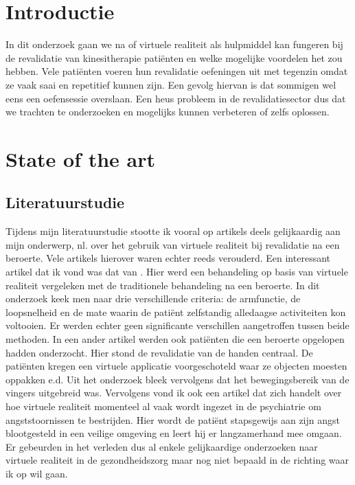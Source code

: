 
\section{Introductie} %
\label{sec:introductie}

In dit onderzoek gaan we na of virtuele realiteit als hulpmiddel kan fungeren bij de revalidatie van kinesitherapie patiënten en welke mogelijke voordelen het zou hebben. Vele patiënten voeren hun revalidatie oefeningen uit met tegenzin omdat ze vaak saai en repetitief kunnen zijn. Een gevolg hiervan is dat sommigen wel eens een oefensessie overslaan. Een heus probleem in de revalidatiesector dus dat we trachten te onderzoeken en mogelijks kunnen verbeteren of zelfs oplossen.



\section{State of the art}
\label{sec:start-of-the-art}

\subsection{Literatuurstudie}
Tijdens mijn literatuurstudie stootte ik vooral op artikels deels gelijkaardig aan mijn onderwerp, nl. over het gebruik van virtuele realiteit bij revalidatie na een beroerte. Vele artikels hierover waren echter reeds verouderd. Een interessant artikel dat ik vond was dat van \textcite{Laver2017}. Hier werd een behandeling op basis van virtuele realiteit vergeleken met de traditionele behandeling na een beroerte. In dit onderzoek keek men naar drie verschillende criteria: de armfunctie, de loopsnelheid en de mate waarin de patiënt zelfstandig alledaagse activiteiten kon voltooien. Er werden echter geen significante verschillen aangetroffen tussen beide methoden. In een ander artikel \textcite{Boian2002} werden ook patiënten die een beroerte opgelopen hadden onderzocht. Hier stond de revalidatie van de handen centraal. De patiënten kregen een virtuele applicatie voorgeschoteld waar ze objecten moesten oppakken e.d. Uit het onderzoek bleek vervolgens dat het bewegingsbereik van de vingers uitgebreid was.  Vervolgens vond ik ook een artikel \textcite{Reddy2018} dat zich handelt over hoe virtuele realiteit momenteel al vaak wordt ingezet in de psychiatrie om angststoornissen te bestrijden. Hier wordt de patiënt stapsgewijs aan zijn angst blootgesteld in een veilige omgeving en leert hij er langzamerhand mee omgaan. Er gebeurden in het verleden dus al enkele gelijkaardige onderzoeken naar virtuele realiteit in de gezondheidszorg maar nog niet bepaald in de richting waar ik op wil gaan.

